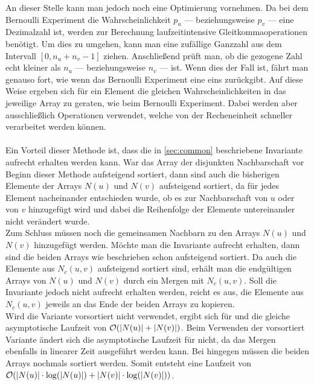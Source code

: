 An dieser Stelle  kann man jedoch noch eine Optimierung vornehmen.
Da bei dem Bernoulli Experiment die Wahrscheinlichkeit $p_{u}$ --- beziehungsweise $p_{v}$ --- eine
Dezimalzahl ist, werden zur Berechnung laufzeitintensive Gleitkommaoperationen 
benötigt. Um dies zu umgehen, kann man eine zufällige Ganzzahl aus dem Intervall
$[0, n_{u} + n_{v}-1]$ ziehen. Anschließend prüft man, ob die gezogene Zahl echt kleiner als $n_{u}$ ---
beziehungsweise $n_{v}$ ---
ist. Wenn dies der Fall ist, fährt man genauso fort, wie wenn das Bernoulli Experiment eine eins
zurückgibt. Auf diese Weise 
ergeben sich für ein Element die gleichen Wahrscheinlichkeiten in das jeweilige Array zu geraten, wie
beim Bernoulli Experiment. Dabei werden aber ausschließlich  Operationen verwendet, welche
von der Recheneinheit schneller verarbeitet werden können.
\\

\\

Ein Vorteil dieser Methode ist, dass die in \ref{sec:common} beschriebene Invariante aufrecht erhalten werden kann.
War das Array der disjunkten Nachbarschaft vor Beginn dieser Methode aufsteigend sortiert,
dann sind auch die bisherigen Elemente der Arrays $N(u)$ und $N(v)$ aufsteigend sortiert, da für jedes
Element nacheinander entschieden wurde, ob es zur Nachbarschaft von $u$ oder von $v$ hinzugefügt wird und dabei die
Reihenfolge der Elemente untereinander nicht verändert wurde.
\\

Zum Schluss müssen noch die gemeinsamen Nachbarn zu den Arrays $N(u)$ und $N(v)$ hinzugefügt werden.
Möchte man die Invariante aufrecht erhalten, dann sind die beiden Arrays wie beschrieben schon
aufsteigend sortiert. Da auch die Elemente aus $N_{c}(u,v)$ aufsteigend sortiert sind, erhält man
die endgültigen Arrays von $N(u)$ und $N(v)$ durch ein Mergen mit $N_{c}(u,v)$. Soll die Invariante jedoch
nicht aufrecht erhalten werden, reicht es aus, die Elemente aus $N_{c}(u,v)$ jeweils an das Ende der beiden Arrays
zu kopieren.
\\

Wird die Variante vorsortiert nicht verwendet, ergibt sich für \perm{} und \distr{}
die gleiche asymptotische Laufzeit von $\mathcal{O}(|N(u)| + |N(v)|)$. 
Beim Verwenden der vorsortiert Variante ändert sich die asymptotische Laufzeit für \distr{}
nicht, da das Mergen ebenfalls in linearer Zeit ausgeführt werden kann. Bei \perm{}
hingegen müssen die beiden Arrays nochmals sortiert werden. Somit entsteht
eine Laufzeit von $\mathcal{O}(|N(u)| \cdot \log(|N(u)|) + |N(v)| \cdot \log(|N(v)|))$.



